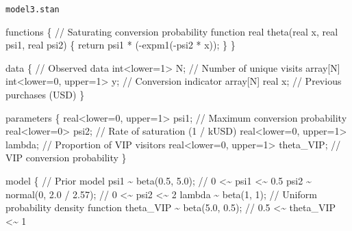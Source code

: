 \documentclass[
  letterpaper,
  DIV=11,
  numbers=noendperiod]{scrartcl}
\newenvironment{Shaded}{\begin{snugshade}}{\end{snugshade}}
\newcommand{\CommentTok}[1]{\textcolor[rgb]{0.37,0.37,0.37}{#1}}
\newcommand{\ControlFlowTok}[1]{\textcolor[rgb]{0.00,0.23,0.31}{#1}}
\newcommand{\DataTypeTok}[1]{\textcolor[rgb]{0.68,0.00,0.00}{#1}}
\newcommand{\DecValTok}[1]{\textcolor[rgb]{0.68,0.00,0.00}{#1}}
\newcommand{\FloatTok}[1]{\textcolor[rgb]{0.68,0.00,0.00}{#1}}
\newcommand{\KeywordTok}[1]{\textcolor[rgb]{0.00,0.23,0.31}{#1}}
\newcommand{\NormalTok}[1]{\textcolor[rgb]{0.00,0.23,0.31}{#1}}
\begin{document}
\begin{codelisting}

\caption{\texttt{model3.stan}}

\begin{Shaded}
\begin{Highlighting}[]
\KeywordTok{functions}\NormalTok{ \{}
  \CommentTok{// Saturating conversion probability function}
  \DataTypeTok{real}\NormalTok{ theta(}\DataTypeTok{real}\NormalTok{ x, }\DataTypeTok{real}\NormalTok{ psi1, }\DataTypeTok{real}\NormalTok{ psi2) \{}
    \ControlFlowTok{return}\NormalTok{ psi1 * ({-}expm1({-}psi2 * x));}
\NormalTok{  \}}
\NormalTok{\}}

\KeywordTok{data}\NormalTok{ \{}
  \CommentTok{// Observed data}
  \DataTypeTok{int}\NormalTok{\textless{}}\KeywordTok{lower}\NormalTok{=}\DecValTok{1}\NormalTok{\textgreater{} N;                    }\CommentTok{// Number of unique visits}
  \DataTypeTok{array}\NormalTok{[N] }\DataTypeTok{int}\NormalTok{\textless{}}\KeywordTok{lower}\NormalTok{=}\DecValTok{0}\NormalTok{, }\KeywordTok{upper}\NormalTok{=}\DecValTok{1}\NormalTok{\textgreater{} y;  }\CommentTok{// Conversion indicator}
  \DataTypeTok{array}\NormalTok{[N] }\DataTypeTok{real}\NormalTok{ x;                   }\CommentTok{// Previous purchases (USD)}
\NormalTok{\}}

\KeywordTok{parameters}\NormalTok{ \{}
  \DataTypeTok{real}\NormalTok{\textless{}}\KeywordTok{lower}\NormalTok{=}\DecValTok{0}\NormalTok{, }\KeywordTok{upper}\NormalTok{=}\DecValTok{1}\NormalTok{\textgreater{} psi1;      }\CommentTok{// Maximum conversion probability}
  \DataTypeTok{real}\NormalTok{\textless{}}\KeywordTok{lower}\NormalTok{=}\DecValTok{0}\NormalTok{\textgreater{} psi2;               }\CommentTok{// Rate of saturation (1 / kUSD)}
  \DataTypeTok{real}\NormalTok{\textless{}}\KeywordTok{lower}\NormalTok{=}\DecValTok{0}\NormalTok{, }\KeywordTok{upper}\NormalTok{=}\DecValTok{1}\NormalTok{\textgreater{} lambda;    }\CommentTok{// Proportion of VIP visitors}
  \DataTypeTok{real}\NormalTok{\textless{}}\KeywordTok{lower}\NormalTok{=}\DecValTok{0}\NormalTok{, }\KeywordTok{upper}\NormalTok{=}\DecValTok{1}\NormalTok{\textgreater{} theta\_VIP; }\CommentTok{// VIP conversion probability}
\NormalTok{\}}

\KeywordTok{model}\NormalTok{ \{}
  \CommentTok{// Prior model}
\NormalTok{  psi1 \textasciitilde{} beta(}\FloatTok{0.5}\NormalTok{, }\FloatTok{5.0}\NormalTok{);        }\CommentTok{// 0   \textless{}\textasciitilde{}    psi1   \textless{}\textasciitilde{} 0.5}
\NormalTok{  psi2 \textasciitilde{} normal(}\DecValTok{0}\NormalTok{, }\FloatTok{2.0}\NormalTok{ / }\FloatTok{2.57}\NormalTok{); }\CommentTok{// 0   \textless{}\textasciitilde{}    psi2   \textless{}\textasciitilde{} 2}
\NormalTok{  lambda \textasciitilde{} beta(}\DecValTok{1}\NormalTok{, }\DecValTok{1}\NormalTok{);          }\CommentTok{// Uniform probability density function}
\NormalTok{  theta\_VIP \textasciitilde{} beta(}\FloatTok{5.0}\NormalTok{, }\FloatTok{0.5}\NormalTok{);   }\CommentTok{// 0.5 \textless{}\textasciitilde{} theta\_VIP \textless{}\textasciitilde{} 1}


\end{Highlighting}
\end{Shaded}
\end{codelisting}
\end{document}
